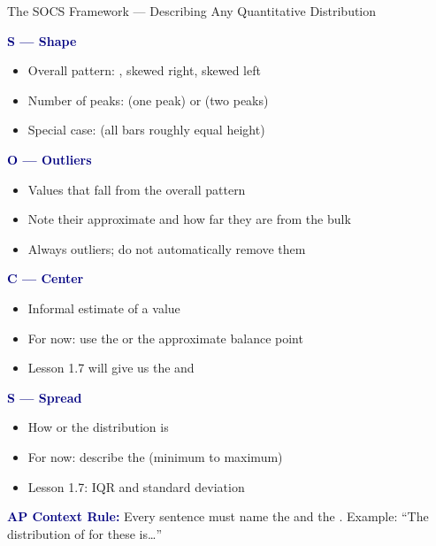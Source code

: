 \documentclass[10pt]{article}
\begin{document}
\vspace{0.1in}

\begin{notesbox}{The SOCS Framework --- Describing Any Quantitative Distribution}
\small

\begin{multicols}{2}

\textbf{\textcolor{navy}{S --- Shape}}
\begin{itemize}[itemsep=2pt]
  \item Overall pattern: \blank{2.5cm}, skewed right, skewed left
  \item Number of peaks: \blank{1.5cm} (one peak) or \blank{1.5cm} (two peaks)
  \item Special case: \blank{1.8cm} (all bars roughly equal height)
\end{itemize}

\vspace{4pt}
\textbf{\textcolor{navy}{O --- Outliers}}
\begin{itemize}[itemsep=2pt]
  \item Values that fall \blank{3cm} from the overall pattern
  \item Note their approximate \blank{2cm} and how far they are from the bulk
  \item Always \blank{2cm} outliers; do not automatically remove them
\end{itemize}

\columnbreak

\textbf{\textcolor{navy}{C --- Center}}
\begin{itemize}[itemsep=2pt]
  \item Informal estimate of a \blank{2.5cm} value
  \item For now: use the \blank{2cm} or the approximate balance point
  \item Lesson 1.7 will give us the \blank{1.5cm} and \blank{1.5cm}
\end{itemize}

\vspace{4pt}
\textbf{\textcolor{navy}{S --- Spread}}
\begin{itemize}[itemsep=2pt]
  \item How \blank{2cm} or \blank{2cm} the distribution is
  \item For now: describe the \blank{1.8cm} (minimum to maximum)
  \item Lesson 1.7: IQR and standard deviation
\end{itemize}

\end{multicols}

\vspace{4pt}
\textbf{\textcolor{navy}{AP Context Rule:}} Every sentence must name the
\blank{2.5cm} and the \blank{2cm}.
Example: ``The distribution of \underline{\hspace{3cm}} for these
\underline{\hspace{2.5cm}} is\ldots''

\end{notesbox}
\end{document}

